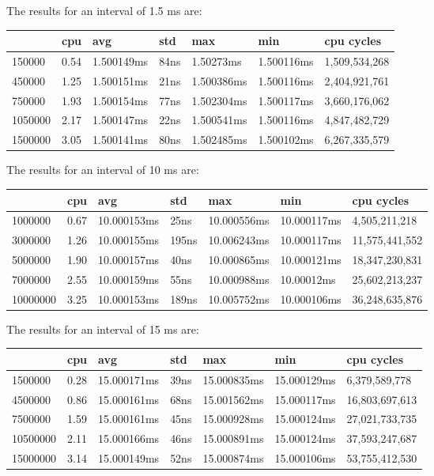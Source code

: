 \documentclass{article}
\begin{document}
The results for an interval of 1.5 ms are: \\
\begin{tabular}{lllllll}
\toprule
 & cpu & avg & std & max & min & cpu cycles \\
\midrule
150000 & 0.54 & 1.500149ms & 84ns & 1.50273ms & 1.500116ms & 1,509,534,268 \\
450000 & 1.25 & 1.500151ms & 21ns & 1.500386ms & 1.500116ms & 2,404,921,761 \\
750000 & 1.93 & 1.500154ms & 77ns & 1.502304ms & 1.500117ms & 3,660,176,062 \\
1050000 & 2.17 & 1.500147ms & 22ns & 1.500541ms & 1.500116ms & 4,847,482,729 \\
1500000 & 3.05 & 1.500141ms & 80ns & 1.502485ms & 1.500102ms & 6,267,335,579 \\
\bottomrule
\end{tabular}


The results for an interval of 10 ms are: \\
\begin{tabular}{lllllll}
\toprule
 & cpu & avg & std & max & min & cpu cycles \\
\midrule
1000000 & 0.67 & 10.000153ms & 25ns & 10.000556ms & 10.000117ms & 4,505,211,218 \\
3000000 & 1.26 & 10.000155ms & 195ns & 10.006243ms & 10.000117ms & 11,575,441,552 \\
5000000 & 1.90 & 10.000157ms & 40ns & 10.000865ms & 10.000121ms & 18,347,230,831 \\
7000000 & 2.55 & 10.000159ms & 55ns & 10.000988ms & 10.00012ms & 25,602,213,237 \\
10000000 & 3.25 & 10.000153ms & 189ns & 10.005752ms & 10.000106ms & 36,248,635,876 \\
\bottomrule
\end{tabular}


The results for an interval of 15 ms are: \\
\begin{tabular}{lllllll}
\toprule
 & cpu & avg & std & max & min & cpu cycles \\
\midrule
1500000 & 0.28 & 15.000171ms & 39ns & 15.000835ms & 15.000129ms & 6,379,589,778 \\
4500000 & 0.86 & 15.000161ms & 68ns & 15.001562ms & 15.000117ms & 16,803,697,613 \\
7500000 & 1.59 & 15.000161ms & 45ns & 15.000928ms & 15.000124ms & 27,021,733,735 \\
10500000 & 2.11 & 15.000166ms & 46ns & 15.000891ms & 15.000124ms & 37,593,247,687 \\
15000000 & 3.14 & 15.000149ms & 52ns & 15.000874ms & 15.000106ms & 53,755,412,530 \\
\bottomrule
\end{tabular}
\end{document}

